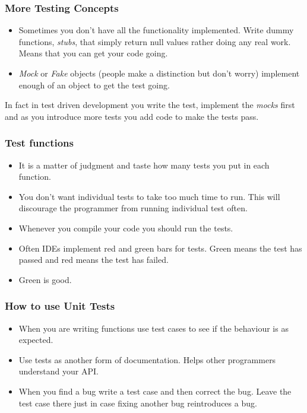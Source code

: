 \documentclass{beamer}
\begin{document}
\begin{frame}
  \frametitle{More Testing Concepts}
  \begin{itemize}
  \item Sometimes you don't have all the functionality
    implemented. Write dummy functions, {\em stubs}, that simply return
    null values rather doing any real work. Means that you can get
    your code going.
  \item {\em Mock} or {\em Fake} objects (people make a distinction
    but don't worry) implement enough of an object to get the test
    going.
  \end{itemize}
In fact in test driven development you write the test, implement the
{\em mocks} first and as you introduce more tests you add code to make the
tests pass.

\end{frame}
\begin{frame}
  \frametitle{Test functions}
  \begin{itemize}
  \item It is a matter of judgment and taste how many tests you put in
    each function.
  \item  You don't want individual tests  to take too much time to
    run. This will discourage the programmer from running individual
    test often.
  \item Whenever you compile your code you should run the tests. 
  \item Often IDEs implement red and green bars for tests. Green means
    the test has passed and red means the test has failed.
  \item Green is good. 
  \end{itemize}
\end{frame}
\begin{frame}
  \frametitle{How to use Unit Tests}
  \begin{itemize}
  \item When you are writing functions use test cases to see if the
    behaviour is as expected.
  \item Use tests as another form of documentation. Helps other
    programmers understand your API.
  \item When you find a bug write a test case and then correct the
    bug. Leave the test case there just in case fixing another bug
    reintroduces a bug.
  \end{itemize}
\end{frame}
\end{document}
